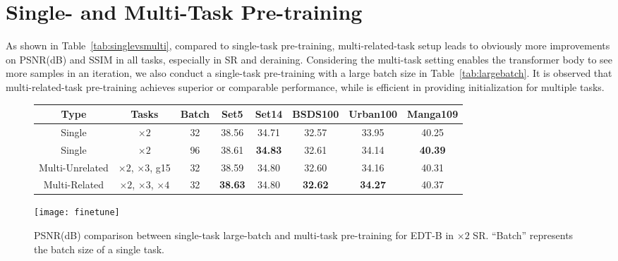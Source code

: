\documentclass[runningheads]{llncs}
\begin{document}
	\section{Single- and Multi-Task Pre-training}
	\label{sec:singlemulti}
	
	As shown in Table~\ref{tab:singlevsmulti}, compared to single-task pre-training, multi-related-task setup leads to obviously more improvements on PSNR(dB) and SSIM in all tasks, especially in SR and deraining. Considering the multi-task setting enables the transformer body to see more samples in an iteration, we also conduct a single-task pre-training with a large batch size in Table~\ref{tab:largebatch}. It is observed that multi-related-task pre-training achieves superior or comparable performance, while is efficient in providing initialization for multiple tasks.
	
	
	\begin{figure}[t]
		\centering
		\begin{minipage}[c]{1.0\linewidth}
			\centering
			\caption{PSNR(dB) comparison between single-task large-batch and multi-task pre-training for EDT-B in $\times 2$ SR. ``Batch'' represents the batch size of a single task.}
			\vspace{0.15in}
			\renewcommand\arraystretch{1.1}
			\setlength\tabcolsep{2pt}
\begin{tabular}{| c | c | c | c c c c c |}
				\hline
				Type & Tasks & Batch & Set5 & Set14 & BSDS100 & Urban100 & Manga109 \\
				\hline
				Single & $\times 2$ & 32 & 38.56 & 34.71 & 32.57 & 33.95 & 40.25 \\
				Single & $\times 2$ & 96 & 38.61 & \textbf{34.83} & 32.61 & 34.14 & \textbf{40.39} \\
				Multi-Unrelated & $\times 2$, $\times 3$, g15 & 32 & 38.59 & 34.80 & 32.60 & 34.16 & 40.31 \\
				Multi-Related & $\times 2$, $\times 3$, $\times 4$ & 32 & \textbf{38.63} & 34.80 & \textbf{32.62} & \textbf{34.27} & 40.37 \\
				\hline
			\end{tabular}
\label{tab:largebatch}
		\end{minipage}\vspace{0.2in}
		\begin{minipage}[c]{1.0\linewidth}
			\centering
			\texttt{[image: finetune]}
			\vspace{-0.2in}
			\label{fig:finetune}
		\end{minipage}
		\vspace{-0.1in}
	\end{figure}
	
\end{document}
